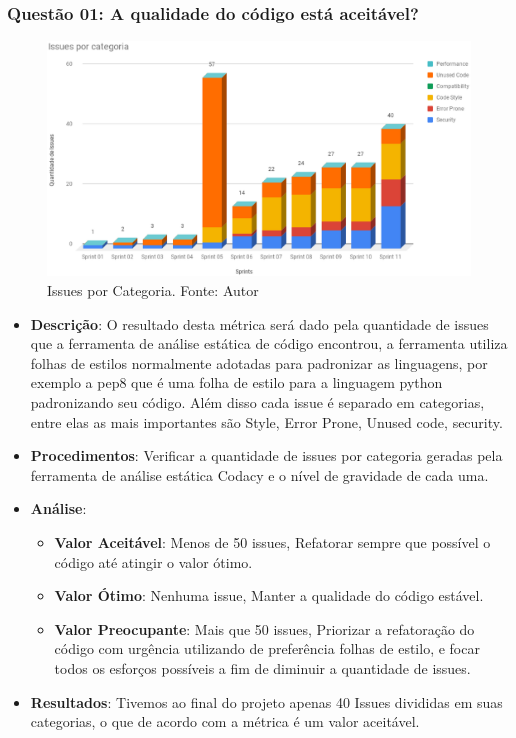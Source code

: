 \subsubsection{Questão 01: A qualidade do código está aceitável?}


\begin{figure}[h!]
	\centering
  \includegraphics[keepaspectratio=true,scale=0.4]{figuras/issues_por_categoria.eps}
  \caption[Issues por Categoria.]{Issues por Categoria. Fonte: Autor}
	\label{fig:issues_categoria}
\end{figure}

\begin{itemize}
  \item \textbf{Descrição}: O resultado desta métrica será dado pela quantidade de issues que a ferramenta de análise estática de código encontrou, a ferramenta utiliza folhas de estilos normalmente adotadas para padronizar as linguagens, por exemplo a pep8 que é uma folha de estilo para a linguagem python padronizando seu código. Além disso cada issue é separado em categorias, entre elas as mais importantes são Style, Error Prone, Unused code, security.
  \item \textbf{Procedimentos}: Verificar a quantidade de issues por categoria geradas pela ferramenta de análise estática Codacy e o nível de gravidade de cada uma.
  \item \textbf{Análise}:
    \begin{itemize}
      \item \textbf{Valor Aceitável}: Menos de 50 issues, Refatorar sempre que possível o código até atingir o valor ótimo.
      \item \textbf{Valor Ótimo}: Nenhuma issue, Manter a qualidade do código estável.
      \item \textbf{Valor Preocupante}: Mais que 50 issues, Priorizar a refatoração do código com urgência utilizando de preferência folhas de estilo, e focar todos os esforços possíveis a fim de diminuir a quantidade de issues.
    \end{itemize}
  \item \textbf{Resultados}: Tivemos ao final do projeto apenas 40 Issues divididas em suas categorias, o que de acordo com a métrica é um valor aceitável.
\end{itemize}


